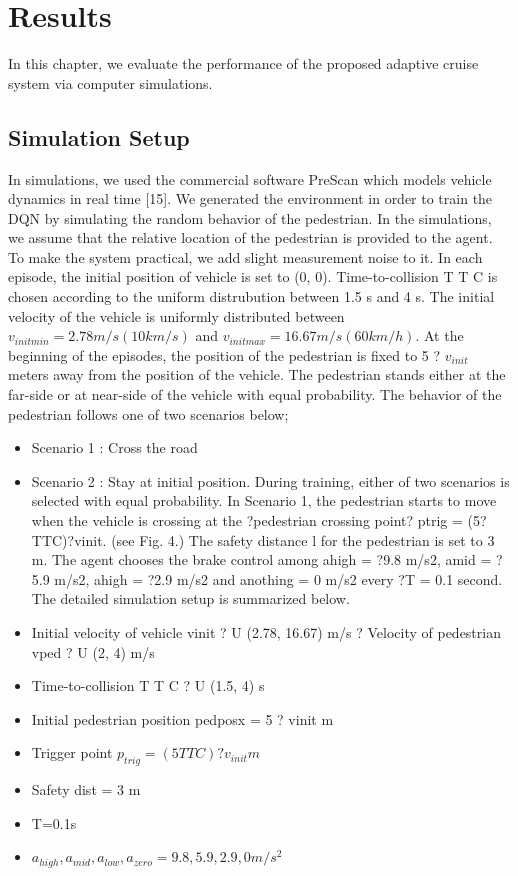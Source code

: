 \chapter{Results}

In this chapter, we evaluate the performance of the proposed adaptive cruise system via computer simulations.

\section{Simulation Setup}

In simulations, we used the commercial software PreScan which models vehicle dynamics in real time [15]. We generated the environment in order to train the DQN by simulating the random behavior of the pedestrian. In the simulations, we assume that the relative location of the pedestrian is provided to the agent. To make the system practical, we add slight measurement noise to it. In each episode, the initial position of vehicle is set to (0, 0). Time-to-collision T T C is chosen according to the uniform distrubution between 1.5 s and 4 s. The initial velocity of the vehicle is uniformly distributed between $v_{initmin} = 2.78 m/s (10 km/s)$ and $v_{initmax} = 16.67 m/s (60 km/h)$. At the beginning of the episodes, the position of the pedestrian is fixed to 5 ? $v_{init}$ meters away from the position of the vehicle. The pedestrian stands either at the far-side or at near-side of the vehicle with equal probability. The behavior of the pedestrian follows one of two scenarios below;

\begin{itemize}
\item Scenario 1 : Cross the road
\item Scenario 2 : Stay at initial position.
During training, either of two scenarios is selected with equal probability. In Scenario 1, the pedestrian starts to move when the vehicle is crossing at the ?pedestrian crossing point? ptrig = (5?TTC)?vinit. (see Fig. 4.) The safety distance l for the pedestrian is set to 3 m. The agent chooses the brake control among ahigh = ?9.8 m/s2, amid = ?5.9 m/s2, ahigh = ?2.9 m/s2 and anothing = 0 m/s2 every ?T = 0.1 second. The detailed simulation setup is summarized below.
\item Initial velocity of vehicle vinit ? U (2.78, 16.67) m/s ? Velocity of pedestrian vped ? U (2, 4) m/s
\item Time-to-collision T T C ? U (1.5, 4) s
\item Initial pedestrian position pedposx = 5 ? vinit m
\item Trigger point $p_{trig} = (5 TTC) ? v_{init} m$
\item Safety dist = 3 m
\item T=0.1s
\item $a_{high}, a_{mid}, a_{low}, a_{zero} = {9.8, 5.9, 2.9, 0} m/s^2$
\end{itemize}

